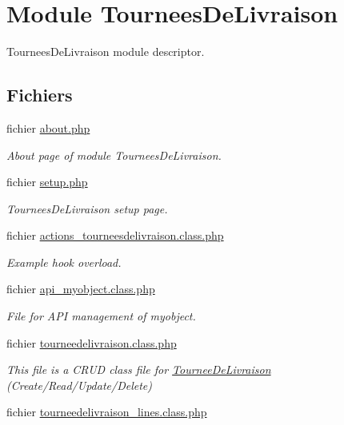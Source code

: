 \hypertarget{group__tourneesdelivraison}{}\section{Module Tournees\+De\+Livraison}
\label{group__tourneesdelivraison}


Tournees\+De\+Livraison module descriptor.  


\subsection*{Fichiers}
\begin{DoxyCompactItemize}
\item 
fichier \hyperlink{about_8php}{about.\+php}
\begin{DoxyCompactList}\small\item\em About page of module Tournees\+De\+Livraison. \end{DoxyCompactList}\item 
fichier \hyperlink{setup_8php}{setup.\+php}
\begin{DoxyCompactList}\small\item\em Tournees\+De\+Livraison setup page. \end{DoxyCompactList}\item 
fichier \hyperlink{actions__tourneesdelivraison_8class_8php}{actions\+\_\+tourneesdelivraison.\+class.\+php}
\begin{DoxyCompactList}\small\item\em Example hook overload. \end{DoxyCompactList}\item 
fichier \hyperlink{api__myobject_8class_8php}{api\+\_\+myobject.\+class.\+php}
\begin{DoxyCompactList}\small\item\em File for A\+PI management of myobject. \end{DoxyCompactList}\item 
fichier \hyperlink{tourneedelivraison_8class_8php}{tourneedelivraison.\+class.\+php}
\begin{DoxyCompactList}\small\item\em This file is a C\+R\+UD class file for \hyperlink{classTourneeDeLivraison}{Tournee\+De\+Livraison} (Create/\+Read/\+Update/\+Delete) \end{DoxyCompactList}\item 
fichier \hyperlink{tourneedelivraison__lines_8class_8php}{tourneedelivraison\+\_\+lines.\+class.\+php}

\end{DoxyCompactItemize}
